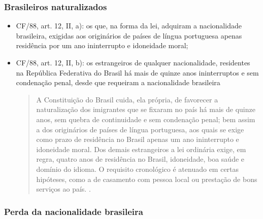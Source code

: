 \documentclass{article}
\begin{document}
\subsubsection{Brasileiros naturalizados}

\begin{itemize}
    \item CF/88, art. 12, II, a): os que, na forma da lei, adquiram a nacionalidade brasileira, exigidas aos originários de países de língua portuguesa apenas residência por um ano ininterrupto e idoneidade moral;
    \item CF/88, art. 12, II, b): os estrangeiros de qualquer nacionalidade, residentes na República Federativa do Brasil há mais de quinze anos ininterruptos e sem condenação penal, desde que requeiram a nacionalidade brasileira
    \begin{quote}
        A Constituição do Brasil cuida, ela própria, de favorecer a naturalização dos imigrantes que se fixaram no país há mais de quinze anos, sem quebra de continuidade e sem condenação penal; bem assim a dos originários de países de língua portuguesa, aos quais se exige como prazo de residência no Brasil apenas um ano ininterrupto e idoneidade moral. Dos demais estrangeiros a lei ordinária exige, em regra, quatro anos de residência no Brasil, idoneidade, boa saúde e domínio do idioma. O requisito cronológico é atenuado em certas hipóteses, como a de casamento com pessoa local ou prestação de bons serviços ao país. \cite[pp.~82-83]{rezek_direito_2024}.
    \end{quote}
\end{itemize}

\subsubsection{Perda da nacionalidade brasileira}
\end{document}
